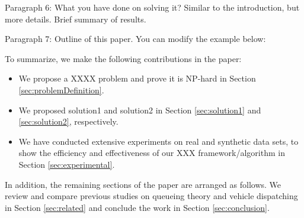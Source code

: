 Paragraph 6: What you have done on solving it?  Similar to the introduction, but more details. Brief summary of results.

Paragraph 7: Outline of this paper. You can modify the example below:

To summarize, we make the following contributions in the paper:
\begin{itemize}[leftmargin=*]
	\item We propose a XXXX problem and prove it is NP-hard in Section \ref{sec:problemDefinition}.\itemMargin
	\item  We proposed solution1 and solution2 in Section \ref{sec:solution1} and \ref{sec:solution2}, respectively.\itemMargin
	\item We have  conducted extensive experiments on real and synthetic data sets, to show the efficiency and effectiveness of our XXX framework/algorithm in Section \ref{sec:experimental}.\itemMargin
\end{itemize}

In addition, the remaining sections of the paper are arranged as
follows. We review and compare previous studies on queueing theory and vehicle dispatching in Section \ref{sec:related} and conclude the work in Section \ref{sec:conclusion}.


